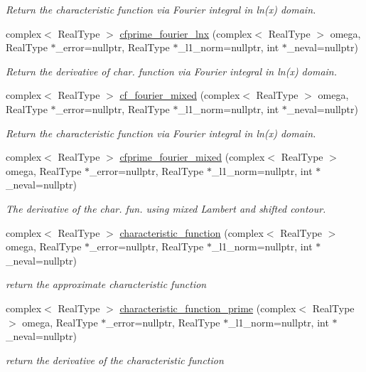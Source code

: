 \begin{DoxyCompactItemize}
\begin{DoxyCompactList}\small\item\em Return the characteristic function via Fourier integral in ln(x) domain. \end{DoxyCompactList}\item 
complex$<$ Real\+Type $>$ \mbox{\hyperlink{structlognormal__distribution_adcd4b3eee23e964a17e6cbc701142d3f}{cfprime\+\_\+fourier\+\_\+lnx}} (complex$<$ Real\+Type $>$ omega, Real\+Type $\ast$\+\_\+error=nullptr, Real\+Type $\ast$\+\_\+l1\+\_\+norm=nullptr, int $\ast$\+\_\+neval=nullptr)
\begin{DoxyCompactList}\small\item\em Return the derivative of char. function via Fourier integral in ln(x) domain. \end{DoxyCompactList}\item 
complex$<$ Real\+Type $>$ \mbox{\hyperlink{structlognormal__distribution_a969271c41bfb153c8983ef0dc1813a6b}{cf\+\_\+fourier\+\_\+mixed}} (complex$<$ Real\+Type $>$ omega, Real\+Type $\ast$\+\_\+error=nullptr, Real\+Type $\ast$\+\_\+l1\+\_\+norm=nullptr, int $\ast$\+\_\+neval=nullptr)
\begin{DoxyCompactList}\small\item\em Return the characteristic function via Fourier integral in ln(x) domain. \end{DoxyCompactList}\item 
complex$<$ Real\+Type $>$ \mbox{\hyperlink{structlognormal__distribution_a3760cd4c0612e34e49edd896f10a03ae}{cfprime\+\_\+fourier\+\_\+mixed}} (complex$<$ Real\+Type $>$ omega, Real\+Type $\ast$\+\_\+error=nullptr, Real\+Type $\ast$\+\_\+l1\+\_\+norm=nullptr, int $\ast$\+\_\+neval=nullptr)
\begin{DoxyCompactList}\small\item\em The derivative of the char. fun. using mixed Lambert and shifted contour. \end{DoxyCompactList}\item 
complex$<$ Real\+Type $>$ \mbox{\hyperlink{structlognormal__distribution_a2b8eebf8ea44cd27b6fc3dd265cbcfe8}{characteristic\+\_\+function}} (complex$<$ Real\+Type $>$ omega, Real\+Type $\ast$\+\_\+error=nullptr, Real\+Type $\ast$\+\_\+l1\+\_\+norm=nullptr, int $\ast$\+\_\+neval=nullptr)
\begin{DoxyCompactList}\small\item\em return the approximate characteristic function \end{DoxyCompactList}\item 
complex$<$ Real\+Type $>$ \mbox{\hyperlink{structlognormal__distribution_ac46cfb90dfcffb18d7cd11423317bb5c}{characteristic\+\_\+function\+\_\+prime}} (complex$<$ Real\+Type $>$ omega, Real\+Type $\ast$\+\_\+error=nullptr, Real\+Type $\ast$\+\_\+l1\+\_\+norm=nullptr, int $\ast$\+\_\+neval=nullptr)
\begin{DoxyCompactList}\small\item\em return the derivative of the characteristic function \end{DoxyCompactList}\end{DoxyCompactItemize}
